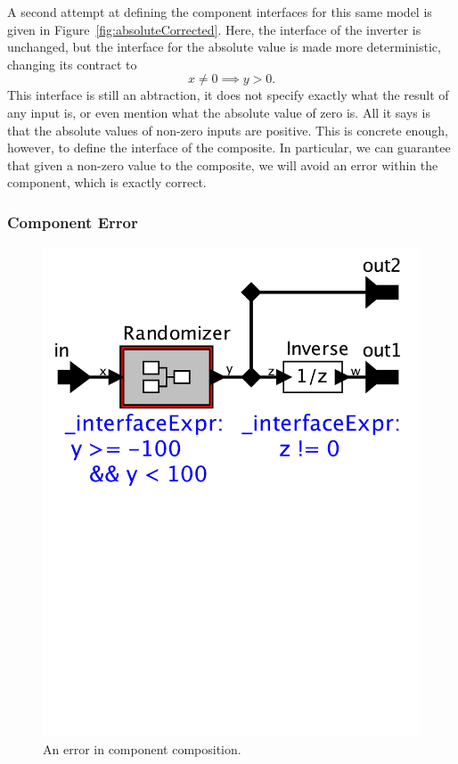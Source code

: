 \documentclass[preprint,11pt]{sigplanconf}
\begin{document}
A second attempt at defining the component interfaces for this same model is
given in Figure~\ref{fig:absoluteCorrected}.
Here, the interface of the inverter is unchanged,
but the interface for the absolute value is made more deterministic, changing
its contract to
\[
x \ne 0 \implies y > 0 .
\]
This interface is still an abtraction, it does not specify exactly what
the result of any input is, or even mention what the absolute value of zero is.
All it says is that the absolute values of non-zero inputs are positive.
This is concrete enough, however, to define the interface of the composite.  In
particular, we can guarantee that given a non-zero value to the composite, we
will avoid an error within the component, which is exactly correct.

\subsubsection{Component Error} \label{sec:componentError}
\begin{figure}[htbp]
\centering
\includegraphics[width=\columnwidth]{figs/Randomizer}
\caption{An error in component composition.}
\label{fig:randomError}
\end{figure}
\end{document}
